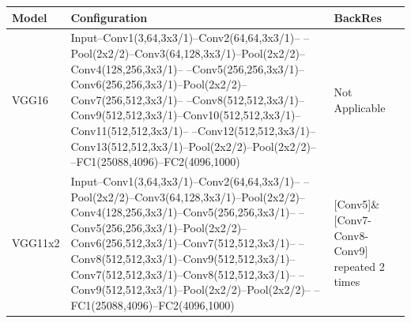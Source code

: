 \begin{tabular}{lll}
\toprule
Model & Configuration & BackRes \\
\midrule
VGG16 & Input–Conv1(3,64,3x3/1)–Conv2(64,64,3x3/1)– –Pool(2x2/2)–Conv3(64,128,3x3/1)–Pool(2x2/2)–Conv4(128,256,3x3/1)– –Conv5(256,256,3x3/1)–Conv6(256,256,3x3/1)–Pool(2x2/2)–Conv7(256,512,3x3/1)– –Conv8(512,512,3x3/1)–Conv9(512,512,3x3/1)–Conv10(512,512,3x3/1)–Conv11(512,512,3x3/1)– –Conv12(512,512,3x3/1)–Conv13(512,512,3x3/1)–Pool(2x2/2)–Pool(2x2/2)– –FC1(25088,4096)–FC2(4096,1000) & Not Applicable \\
VGG11x2 & Input–Conv1(3,64,3x3/1)–Conv2(64,64,3x3/1)– –Pool(2x2/2)–Conv3(64,128,3x3/1)–Pool(2x2/2)–Conv4(128,256,3x3/1)–Conv5(256,256,3x3/1)– –Conv5(256,256,3x3/1)–Pool(2x2/2)–Conv6(256,512,3x3/1)–Conv7(512,512,3x3/1)– –Conv8(512,512,3x3/1)–Conv9(512,512,3x3/1)–Conv7(512,512,3x3/1)–Conv8(512,512,3x3/1)– –Conv9(512,512,3x3/1)–Pool(2x2/2)–Pool(2x2/2)– –FC1(25088,4096)–FC2(4096,1000) & [Conv5]\& [Conv7- Conv8- Conv9] repeated 2 times \\
\bottomrule
\end{tabular}
